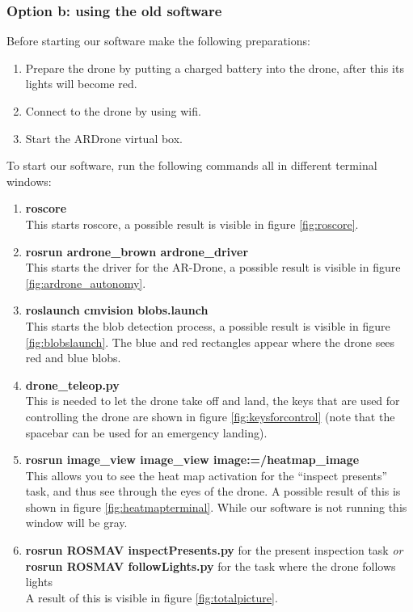 \documentclass[a4paper,10pt]{article}
\begin{document}
\subsubsection{Option b: using the old software}
Before starting our software make the following preparations: 
\begin{enumerate}
	\item Prepare the drone by putting a charged battery into the drone, after this its lights will become red.
	\item Connect to the drone by using wifi. 
	\item Start the ARDrone virtual box.  
\end{enumerate}
To start our software, run the following commands all in different terminal windows:
\begin{enumerate}
\item \textbf{roscore} \\ This starts roscore, a possible result is visible in figure \ref{fig:roscore}.
\item \textbf{rosrun ardrone\_brown ardrone\_driver} \\ This starts the driver for the AR-Drone, a possible result is visible in figure \ref{fig:ardrone_autonomy}.
\item \textbf{roslaunch cmvision blobs.launch} \\ This starts the blob detection process, a possible result is visible in figure \ref{fig:blobslaunch}. The blue and red rectangles appear where the drone sees red and blue blobs. 
\item \textbf{drone\_teleop.py}  \\ This is needed to let the drone take off and land, the keys that are used for controlling the drone are shown in figure \ref{fig:keysforcontrol} (note that the spacebar can be used for an emergency landing).
\item \textbf{rosrun image\_view image\_view image:=/heatmap\_image} \\ This
      allows you to see the heat map activation for the ``inspect presents''
      task, and thus see through the eyes of the drone. A possible result of this is shown in figure \ref{fig:heatmapterminal}. While our software is not running this window will be gray. 
\item \textbf{rosrun ROSMAV inspectPresents.py} for the present inspection task \textit{or} \\
      \textbf{rosrun ROSMAV followLights.py} for the task where the drone follows lights\\
      A result of this is visible in figure \ref{fig:totalpicture}.
\end{enumerate}
\end{document}
